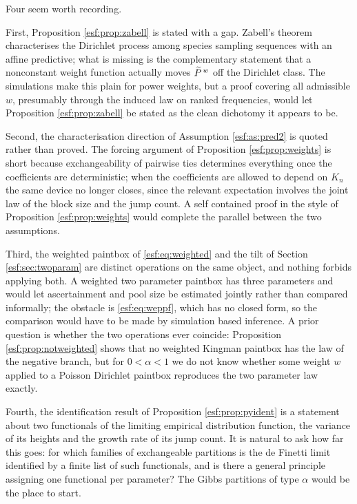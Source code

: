 Four seem worth recording.

First, Proposition \ref{esf:prop:zabell} is stated with a gap. Zabell's theorem
characterises the Dirichlet process among species sampling sequences with an affine
predictive; what is missing is the complementary statement that a nonconstant weight
function actually moves $\widetilde{P}^{\, w}$ off the Dirichlet class. The simulations make
this plain for power weights, but a proof covering all admissible $w$, presumably
through the induced law on ranked frequencies, would let Proposition
\ref{esf:prop:zabell} be stated as the clean dichotomy it appears to be.

Second, the characterisation direction of Assumption \ref{esf:as:pred2} is quoted rather
than proved. The forcing argument of Proposition \ref{esf:prop:weights} is short because
exchangeability of pairwise ties determines everything once the coefficients are
deterministic; when the coefficients are allowed to depend on $K_n$ the same device no
longer closes, since the relevant expectation involves the joint law of the block size
and the jump count. A self contained proof in the style of Proposition
\ref{esf:prop:weights} would complete the parallel between the two assumptions.

Third, the weighted paintbox of \eqref{esf:eq:weighted} and the tilt of Section
\ref{esf:sec:twoparam} are distinct operations on the same object, and nothing forbids
applying both. A weighted two parameter paintbox has three parameters and would let
ascertainment and pool size be estimated jointly rather than compared informally; the
obstacle is \eqref{esf:eq:weppf}, which has no closed form, so the comparison would have
to be made by simulation based inference. A prior question is whether the two operations ever coincide: Proposition \ref{esf:prop:notweighted} shows that no weighted Kingman paintbox has the law of the negative branch, but for $0 < \alpha < 1$ we do not know whether some weight $w$ applied to a Poisson Dirichlet paintbox reproduces the two parameter law exactly.

Fourth, the identification result of Proposition \ref{esf:prop:pyident} is a statement
about two functionals of the limiting empirical distribution function, the variance of
its heights and the growth rate of its jump count. It is natural to ask how far this
goes: for which families of exchangeable partitions is the de Finetti limit identified
by a finite list of such functionals, and is there a general principle assigning one
functional per parameter? The Gibbs partitions of type $\alpha$ \citep{esf:gnedin2006} would be the place
to start.

